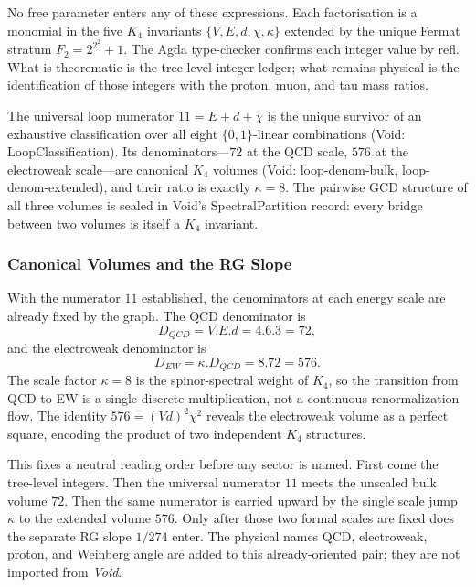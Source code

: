 \documentclass[11pt,a4paper]{book}
\def\cdot{.}%
\def\mathrm#1{#1}%
\def\texttt#1{#1}%
\begin{document}
No free parameter enters any of these expressions.  Each factorisation
is a monomial in the five $K_4$ invariants $\{V, E, d, \chi, \kappa\}$
extended by the unique Fermat stratum $F_2 = 2^{2^2} + 1$.  The
Agda type-checker confirms each integer value by \texttt{refl}.  What is
theorematic is the tree-level integer ledger; what remains physical is
the identification of those integers with the proton, muon, and tau
mass ratios.

The universal loop numerator $11 = E + d + \chi$ is the unique survivor of
an exhaustive classification over all eight $\{0,1\}$-linear combinations
(Void: \texttt{LoopClassification}).
Its denominators---$72$ at the QCD scale, $576$ at the electroweak
scale---are canonical $K_4$ volumes (Void: \texttt{loop-denom-bulk},
\texttt{loop-denom-extended}), and their ratio is exactly $\kappa = 8$.
The pairwise GCD structure of all three volumes is sealed in
Void's \texttt{SpectralPartition} record: every bridge between
two volumes is itself a $K_4$ invariant.

\subsubsection*{Canonical Volumes and the RG Slope}

With the numerator $11$ established, the denominators at each energy
scale are already fixed by the graph.  The QCD denominator is
\[
  D_{\mathrm{QCD}} = V \cdot E \cdot d = 4 \cdot 6 \cdot 3 = 72,
\]
and the electroweak denominator is
\[
  D_{\mathrm{EW}} = \kappa \cdot D_{\mathrm{QCD}} = 8 \cdot 72 = 576.
\]
The scale factor $\kappa = 8$ is the spinor-spectral weight of $K_4$,
so the transition from QCD to EW is a single discrete multiplication,
not a continuous renormalization flow.  The identity $576 = (Vd)^2 \chi^2$
reveals the electroweak volume as a perfect square, encoding the
product of two independent $K_4$ structures.

This fixes a neutral reading order before any sector is named. First come the tree-level integers. Then the universal numerator $11$ meets the unscaled bulk volume $72$. Then the same numerator is carried upward by the single scale jump $\kappa$ to the extended volume $576$. Only after those two formal scales are fixed does the separate RG slope $1/274$ enter. The physical names QCD, electroweak, proton, and Weinberg angle are added to this already-oriented pair; they are not imported from \textit{Void}.
\end{document}
